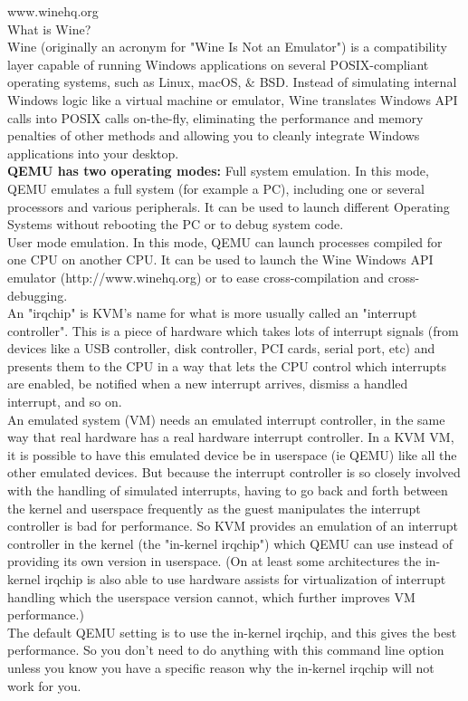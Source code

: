 \documentclass[11pt, a4paper, oneside]{article}
\theoremstyle{definition}
\begin{document}
www.winehq.org\\
What is Wine?\\
Wine (originally an acronym for "Wine Is Not an Emulator") is a compatibility layer capable of running Windows applications on several POSIX-compliant operating systems, such as Linux, macOS, $\&$ BSD. Instead of simulating internal Windows logic like a virtual machine or emulator, Wine translates Windows API calls into POSIX calls on-the-fly, eliminating the performance and memory penalties of other methods and allowing you to cleanly integrate Windows applications into your desktop.\\
\textbf{QEMU has two operating modes:}
Full system emulation. In this mode, QEMU emulates a full system (for example a PC),
including one or several processors and various peripherals. It can be used to launch
different Operating Systems without rebooting the PC or to debug system code.\\
User mode emulation. In this mode, QEMU can launch processes compiled for one
CPU on another CPU. It can be used to launch the Wine Windows API emulator
(http://www.winehq.org) or to ease cross-compilation and cross-debugging.\\


An "irqchip" is KVM's name for what is more usually called an "interrupt controller". This is a piece of hardware which takes lots of interrupt signals (from devices like a USB controller, disk controller, PCI cards, serial port, etc) and presents them to the CPU in a way that lets the CPU control which interrupts are enabled, be notified when a new interrupt arrives, dismiss a handled interrupt, and so on.\\
An emulated system (VM) needs an emulated interrupt controller, in the same way that real hardware has a real hardware interrupt controller. In a KVM VM, it is possible to have this emulated device be in userspace (ie QEMU) like all the other emulated devices. But because the interrupt controller is so closely involved with the handling of simulated interrupts, having to go back and forth between the kernel and userspace frequently as the guest manipulates the interrupt controller is bad for performance. So KVM provides an emulation of an interrupt controller in the kernel (the "in-kernel irqchip") which QEMU can use instead of providing its own version in userspace. (On at least some architectures the in-kernel irqchip is also able to use hardware assists for virtualization of interrupt handling which the userspace version cannot, which further improves VM performance.)\\
The default QEMU setting is to use the in-kernel irqchip, and this gives the best performance. So you don't need to do anything with this command line option unless you know you have a specific reason why the in-kernel irqchip will not work for you.\\
\end{document}
